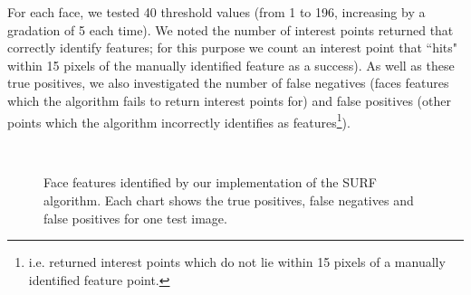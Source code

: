 For each face, we tested 40 threshold values (from 1 to 196, increasing by a gradation of 5 each time). We noted the number of interest points returned that correctly identify features; for this purpose we count an interest point that ``hits" within 15 pixels of the manually identified feature as a success). As well as these true positives, we also investigated the number of false negatives (faces features which the algorithm fails to return interest points for) and false positives (other points which the algorithm incorrectly identifies as features\footnote{ i.e. returned interest points which do not lie within 15 pixels of a manually identified feature point.}).

\begin{figure} [h]
  \centering
  \\
  \caption[Face features identified by our SURF implementation (images 3 \& 4)]{Face features identified by our implementation of the SURF algorithm. Each chart shows the true positives, false negatives and false positives for one test image.}
  \label{fig:face-features-hits-2}
\end{figure}

